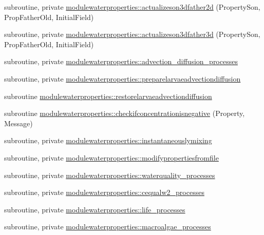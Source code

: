 \begin{DoxyCompactItemize}
\item 
subroutine, private \mbox{\hyperlink{namespacemodulewaterproperties_ab0b8edf280ffb8e69ae400f400b252c9}{modulewaterproperties\+::actualizeson3dfather2d}} (Property\+Son, Prop\+Father\+Old, Initial\+Field)
\item 
subroutine, private \mbox{\hyperlink{namespacemodulewaterproperties_a300389c60d61f49a71a655925f38baab}{modulewaterproperties\+::actualizeson3dfather3d}} (Property\+Son, Prop\+Father\+Old, Initial\+Field)
\item 
subroutine, private \mbox{\hyperlink{namespacemodulewaterproperties_a2450d655461a0013ffb3d932848b59b7}{modulewaterproperties\+::advection\+\_\+diffusion\+\_\+processes}}
\item 
subroutine, private \mbox{\hyperlink{namespacemodulewaterproperties_ac64c0bef47a698a3d4ee6c542620ff58}{modulewaterproperties\+::preparelarvaeadvectiondiffusion}}
\item 
subroutine \mbox{\hyperlink{namespacemodulewaterproperties_abd63efefa04ded5606dbc3b60797d347}{modulewaterproperties\+::restorelarvaeadvectiondiffusion}}
\item 
subroutine \mbox{\hyperlink{namespacemodulewaterproperties_a1edbcfe150c3db4a47036d7e4bfcdda3}{modulewaterproperties\+::checkifconcentrationisnegative}} (Property, Message)
\item 
subroutine, private \mbox{\hyperlink{namespacemodulewaterproperties_ac2912c1f90322adb405cc7d8f1d67898}{modulewaterproperties\+::instantaneouslymixing}}
\item 
subroutine, private \mbox{\hyperlink{namespacemodulewaterproperties_a0b4d4f88a02be98e446a383c70ac8803}{modulewaterproperties\+::modifypropertiesfromfile}}
\item 
subroutine, private \mbox{\hyperlink{namespacemodulewaterproperties_a330fc5f39079fff0948cbca492cf139a}{modulewaterproperties\+::waterquality\+\_\+processes}}
\item 
subroutine, private \mbox{\hyperlink{namespacemodulewaterproperties_a77c662c86e2d882859f2a18d2cde59d1}{modulewaterproperties\+::cequalw2\+\_\+processes}}
\item 
subroutine, private \mbox{\hyperlink{namespacemodulewaterproperties_ad72c8ac146887990ee173526b0a484f1}{modulewaterproperties\+::life\+\_\+processes}}
\item 
subroutine, private \mbox{\hyperlink{namespacemodulewaterproperties_aa89a84314cb0905ce7ee9f02c7c35393}{modulewaterproperties\+::macroalgae\+\_\+processes}}
\item 

\end{DoxyCompactItemize}
